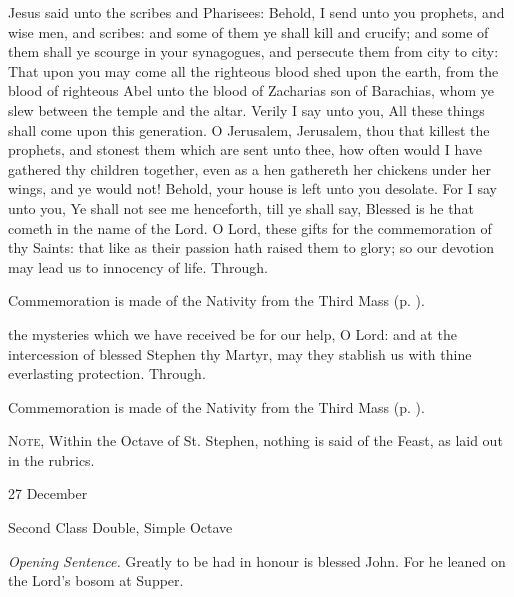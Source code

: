  Jesus said unto the scribes and Pharisees: Behold, I send unto you prophets, and wise men, and scribes: and some of them ye shall kill and crucify; and some of them shall ye scourge in your synagogues, and persecute them from city to city: That upon you may come all the righteous blood shed upon the earth, from the blood of righteous Abel unto the blood of Zacharias son of Barachias, whom ye slew between the temple and the altar. Verily I say unto you, All these things shall come upon this generation. O Jerusalem, Jerusalem, thou that killest the prophets, and stonest them which are sent unto thee, how often would I have gathered thy children together, even as a hen gathereth her chickens under her wings, and ye would not! Behold, your house is left unto you desolate. For I say unto you, Ye shall not see me henceforth, till ye shall say, Blessed is he that cometh in the name of the Lord.
\secret
{} O Lord, these gifts for the commemoration of thy Saints: that like as their passion hath raised them to glory; so our devotion may lead us to innocency of life. Through.
\begin{rubric}
    Commemoration is made of the Nativity from the Third Mass (p. \pageref{NativityMassIIISecret}).
\end{rubric}
\postcommunion
{} the mysteries which we have received be for our help, O Lord: and at the intercession of blessed Stephen thy Martyr, may they stablish us with thine everlasting protection. Through.
\begin{rubric}
    Commemoration is made of the Nativity from the Third Mass (p. \pageref{NativityMassIIIPostcommunion}).
\end{rubric}
\begin{rubric}
    \textsc{Note,} Within the Octave of St. Stephen, nothing is said of the Feast, as laid out in the rubrics.
\end{rubric}

\begin{inhead}
{27 December}\par
{Second Class Double, Simple Octave}
\end{inhead}
\par\noindent
\textit{Opening Sentence.} Greatly to be had in honour is blessed John. For he leaned on the Lord's bosom at Supper.

